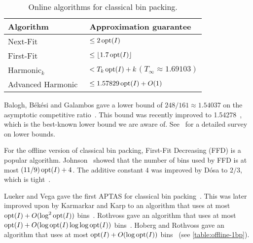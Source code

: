 \begin{table}[ht]
\centering
\caption{Online algorithms for classical bin packing.}
\begin{tabular}{ll}
\toprule Algorithm & Approximation guarantee
\\ \midrule Next-Fit~\cite{johnson-thesis}
    & $\le 2\operatorname{opt}(I)$
\\[\defaultaddspace] First-Fit~\cite{dosa2013first}
    & $\le \left\lfloor 1.7\operatorname{opt}(I) \right\rfloor$
\\[\defaultaddspace] Harmonic$_k$~\cite{leelee}
    & $< T_k\operatorname{opt}(I) + k$\quad $(T_\infty \approx 1.69103)$
\\[\defaultaddspace] Advanced Harmonic~\cite{balogh2018}
    & $\le 1.57829\operatorname{opt}(I) + O(1)$
\\ \bottomrule
\end{tabular}
\label{table:online-1bp}
\end{table}

Balogh, B\'ek\'esi and Galambos gave a lower bound of $248/161 \approx 1.54037$
on the asymptotic competitive ratio~\cite{balogh2012new}.
This bound was recently improved to 1.54278~\cite{balogh2021new},
which is the best-known lower bound we are aware of.
See~\cite{handbook-of-combinopt-bp} for a detailed survey on lower bounds.

For the offline version of classical bin packing,
First-Fit Decreasing (FFD) is a popular algorithm.
Johnson~\cite{johnson-thesis} showed that the number of bins used by
FFD is at most $(11/9)\operatorname{opt}(I) + 4$.
The additive constant $4$ was improved by D\'osa
to $2/3$, which is tight~\cite{dosa2007tight}.

Lueker and Vega gave the first APTAS for classical bin packing~\cite{bp-aptas}.
This was later improved upon by Karmarkar and Karp to an algorithm
that uses at most $\operatorname{opt}(I) + O(\log^2\operatorname{opt}(I))$ bins~\cite{karmarkar-karp}.
Rothvoss gave an algorithm that uses at most
$\operatorname{opt}(I) + O(\log\operatorname{opt}(I)\log\log\operatorname{opt}(I))$ bins~\cite{rothvoss2013}.
Hoberg and Rothvoss gave an algorithm that uses at most
$\operatorname{opt}(I) + O(\log\operatorname{opt}(I))$ bins~\cite{HobergR17}
(see \cref{table:offline-1bp}).

